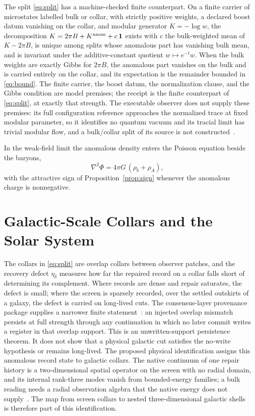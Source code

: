 \documentclass[11pt]{article}
\begin{document}
The split \eqref{eq:split} has a machine-checked finite counterpart. On a
finite carrier of microstates labelled bulk or collar, with strictly
positive weights, a declared boost datum vanishing on the collar, and
modular generator \(K=-\log w\), the decomposition
\(K=2\pi B+K^{\rm anom}+c\,\mathbf 1\) exists with \(c\) the bulk-weighted
mean of \(K-2\pi B\), is unique among splits whose anomalous part has
vanishing bulk mean, and is invariant under the additive-constant
quotient \(w\mapsto e^{-t}w\). When the bulk weights are exactly Gibbs for
\(2\pi B\), the anomalous part vanishes on the bulk and is carried
entirely on the collar, and its expectation is the remainder bounded in
\eqref{eq:bound}. The finite carrier, the boost datum, the normalization
clause, and the Gibbs condition are model premises; the receipt is the
finite counterpart of \eqref{eq:split}, at exactly that strength. The
executable observer does not supply these premises: its full configuration
reference approaches the normalized trace at fixed modular parameter, so it
identifies no quantum vacuum and its tracial limit has trivial modular flow,
and a bulk/collar split of its source is not
constructed~\cite{ophtimefields,ophentropy}.

In the weak-field limit the anomalous density enters the Poisson equation
beside the baryons,
\begin{equation}
\nabla^2\Phi=4\pi G\,(\rho_b+\rho_A),
\label{eq:poisson}
\end{equation}
with the attractive sign of Proposition~\ref{prop:sign} whenever the
anomalous charge is nonnegative.

\section{Galactic-Scale Collars and the Solar System}
\label{sec:solar}

The collars in \eqref{eq:split} are overlap collars between observer
patches, and the recovery defect \(\eta_\delta\) measures how far the
repaired record on a collar falls short of determining its complement. Where
records are dense and repair saturates, the defect is small; where the
screen is sparsely recorded, over the settled outskirts of a galaxy, the
defect is carried on long-lived cuts. The consensus-layer provenance package
supplies a narrower finite statement~\cite{ophconsensus}: an injected overlap
mismatch persists at full strength through any continuation in which no later
commit writes a register in that overlap support. This is an unwritten-support
persistence theorem. It does not show that a physical galactic cut satisfies
the no-write hypothesis or remains long-lived. The proposed physical
identification assigns this anomalous record state to galactic collars.
The native continuum of one repair history is a two-dimensional spatial
operator on the screen with no radial domain, and its internal rank-three
modes vanish from bounded-energy families; a bulk reading needs a radial
observation algebra that the native energy does not
supply~\cite{ophcontinuum}. The map from screen collars to nested
three-dimensional galactic shells is therefore part of this identification.
\end{document}
